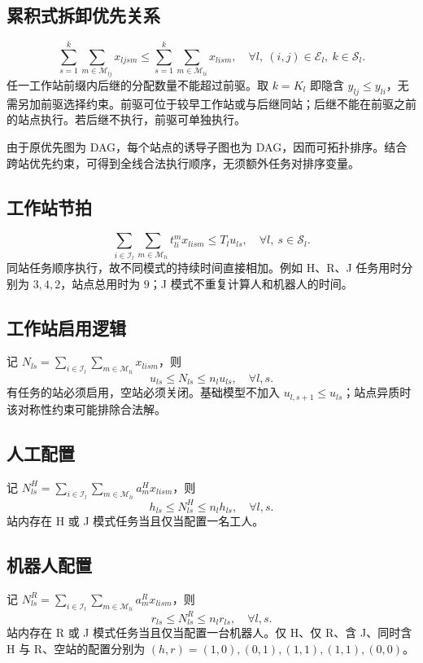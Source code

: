 \documentclass[UTF8,a4paper,11pt]{ctexart}
\begin{document}
\subsection{累积式拆卸优先关系}
\begin{equation}
\sum_{s=1}^{k}\sum_{m\in\mathcal M_{lj}}x_{ljsm}
\leq\sum_{s=1}^{k}\sum_{m\in\mathcal M_{li}}x_{lism},
\quad\forall l,\ (i,j)\in\mathcal E_l,\ k\in\mathcal S_l.\tag{7}
\end{equation}
任一工作站前缀内后继的分配数量不能超过前驱。取 $k=K_l$ 即隐含 $y_{lj}\leq y_{li}$，无需另加前驱选择约束。前驱可位于较早工作站或与后继同站；后继不能在前驱之前的站点执行。若后继不执行，前驱可单独执行。

由于原优先图为 DAG，每个站点的诱导子图也为 DAG，因而可拓扑排序。结合跨站优先约束，可得到全线合法执行顺序，无须额外任务对排序变量。

\subsection{工作站节拍}
\begin{equation}
\sum_{i\in\mathcal I_l}\sum_{m\in\mathcal M_{li}}t_{li}^{m}x_{lism}
\leq T_lu_{ls},\quad\forall l,\ s\in\mathcal S_l.\tag{8}
\end{equation}
同站任务顺序执行，故不同模式的持续时间直接相加。例如 H、R、J 任务用时分别为 $3,4,2$，站点总用时为 $9$；J 模式不重复计算人和机器人的时间。

\subsection{工作站启用逻辑}
记 $N_{ls}=\sum_{i\in\mathcal I_l}\sum_{m\in\mathcal M_{li}}x_{lism}$，则
\begin{equation}
u_{ls}\leq N_{ls}\leq n_lu_{ls},\quad\forall l,s.\tag{9}
\end{equation}
有任务的站必须启用，空站必须关闭。基础模型不加入 $u_{l,s+1}\leq u_{ls}$；站点异质时该对称性约束可能排除合法解。

\subsection{人工配置}
记 $N_{ls}^{H}=\sum_{i\in\mathcal I_l}\sum_{m\in\mathcal M_{li}}a_m^Hx_{lism}$，则
\begin{equation}
h_{ls}\leq N_{ls}^{H}\leq n_lh_{ls},\quad\forall l,s.\tag{10}
\end{equation}
站内存在 H 或 J 模式任务当且仅当配置一名工人。

\subsection{机器人配置}
记 $N_{ls}^{R}=\sum_{i\in\mathcal I_l}\sum_{m\in\mathcal M_{li}}a_m^Rx_{lism}$，则
\begin{equation}
r_{ls}\leq N_{ls}^{R}\leq n_lr_{ls},\quad\forall l,s.\tag{11}
\end{equation}
站内存在 R 或 J 模式任务当且仅当配置一台机器人。仅 H、仅 R、含 J、同时含 H 与 R、空站的配置分别为 $(h,r)=(1,0),(0,1),(1,1),(1,1),(0,0)$。
\end{document}
